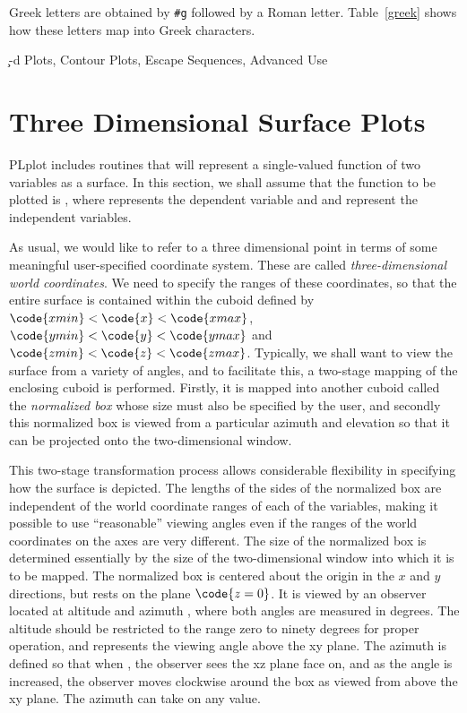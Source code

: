 Greek letters are obtained by \verb+#g+ followed by a Roman letter.
Table~\ref{greek} shows how these letters map into Greek
characters.
{}

\c %

-d Plots, Contour Plots, Escape Sequences, Advanced Use
\section{Three Dimensional Surface Plots}

PLplot includes routines that will represent a single-valued function of
two variables as a surface.  In this section, we shall assume that the
function to be plotted is , where  represents the
dependent variable and  and  represent the independent
variables.

As usual, we would like to refer to a three dimensional point  in terms of some meaningful user-specified coordinate system.
These are called \emph{three-dimensional world coordinates}.  We need to
specify the ranges of these coordinates, so that the entire surface is
contained within the cuboid defined by
$\code{xmin}<\code{x}<\code{xmax}$, $\code{ymin}<\code{y}<\code{ymax}$
and $\code{zmin}<\code{z}<\code{zmax}$.  Typically, we shall want to
view the surface from a variety of angles, and to facilitate this, a
two-stage mapping of the enclosing cuboid is performed.  Firstly, it is
mapped into another cuboid called the \emph{normalized box} whose size
must also be specified by the user, and secondly this normalized box is
viewed from a particular azimuth and elevation so that it can be
projected onto the two-dimensional window.

This two-stage transformation process allows considerable flexibility in
specifying how the surface is depicted.  The lengths of the sides of the
normalized box are independent of the world coordinate ranges of each of
the variables, making it possible to use ``reasonable'' viewing angles
even if the ranges of the world coordinates on the axes are very
different.  The size of the normalized box is determined essentially by
the size of the two-dimensional window into which it is to be mapped.
The normalized box is centered about the origin in the $x$ and $y$
directions, but rests on the plane $\code{z = 0}$.  It is viewed by an
observer located at altitude  and azimuth , where
both angles are measured in degrees.  The altitude should be restricted
to the range zero to ninety degrees for proper operation, and represents
the viewing angle above the xy plane.  The azimuth is defined so that
when , the observer sees the xz plane face on, and as the
angle is increased, the observer moves clockwise around the box as
viewed from above the xy plane.  The azimuth can take on any
value. 

